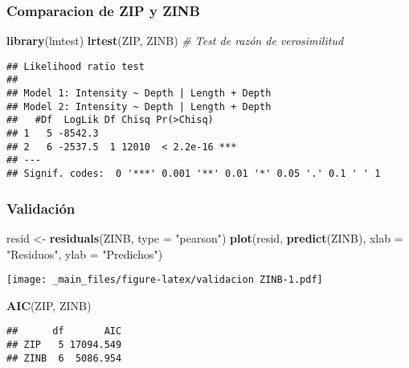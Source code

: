 \documentclass[
]{book}
\newenvironment{Shaded}{\begin{snugshade}}{\end{snugshade}}
\newcommand{\CommentTok}[1]{\textcolor[rgb]{0.56,0.35,0.01}{\textit{#1}}}
\newcommand{\DataTypeTok}[1]{\textcolor[rgb]{0.13,0.29,0.53}{#1}}
\newcommand{\KeywordTok}[1]{\textcolor[rgb]{0.13,0.29,0.53}{\textbf{#1}}}
\newcommand{\NormalTok}[1]{#1}
\newcommand{\StringTok}[1]{\textcolor[rgb]{0.31,0.60,0.02}{#1}}
\begin{document}
\hypertarget{comparacion-de-zip-y-zinb}{%
\subsubsection{Comparacion de ZIP y ZINB}\label{comparacion-de-zip-y-zinb}}

\begin{Shaded}
\begin{Highlighting}[]
\KeywordTok{library}\NormalTok{(lmtest)}
\KeywordTok{lrtest}\NormalTok{(ZIP, ZINB) }\CommentTok{# Test de razón de verosimilitud}
\end{Highlighting}
\end{Shaded}

\begin{verbatim}
## Likelihood ratio test
## 
## Model 1: Intensity ~ Depth | Length + Depth
## Model 2: Intensity ~ Depth | Length + Depth
##   #Df  LogLik Df Chisq Pr(>Chisq)    
## 1   5 -8542.3                        
## 2   6 -2537.5  1 12010  < 2.2e-16 ***
## ---
## Signif. codes:  0 '***' 0.001 '**' 0.01 '*' 0.05 '.' 0.1 ' ' 1
\end{verbatim}

\hypertarget{validaciuxf3n-1}{%
\subsubsection{Validación}\label{validaciuxf3n-1}}

\begin{Shaded}
\begin{Highlighting}[]
\NormalTok{resid <-}\StringTok{ }\KeywordTok{residuals}\NormalTok{(ZINB, }\DataTypeTok{type =} \StringTok{"pearson"}\NormalTok{)}
\KeywordTok{plot}\NormalTok{(resid, }\KeywordTok{predict}\NormalTok{(ZINB), }\DataTypeTok{xlab =} \StringTok{"Residuos"}\NormalTok{, }\DataTypeTok{ylab =} \StringTok{"Predichos"}\NormalTok{)}
\end{Highlighting}
\end{Shaded}

\texttt{[image: \_main\_files/figure-latex/validacion ZINB-1.pdf]}

\begin{Shaded}
\begin{Highlighting}[]
\KeywordTok{AIC}\NormalTok{(ZIP, ZINB)}
\end{Highlighting}
\end{Shaded}

\begin{verbatim}
##      df       AIC
## ZIP   5 17094.549
## ZINB  6  5086.954
\end{verbatim}
\end{document}
